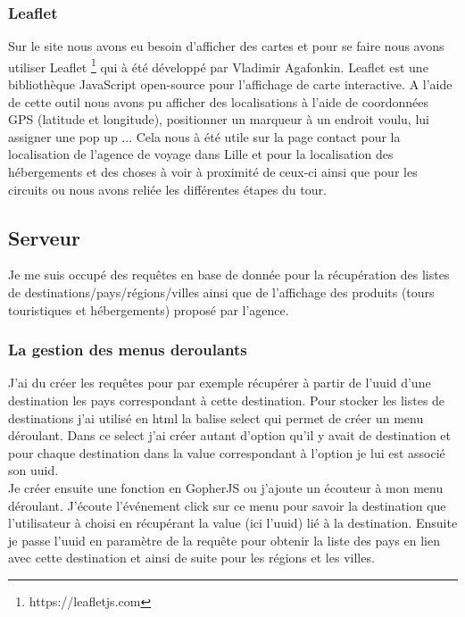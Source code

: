 \documentclass[12pt,a4paper]{report}
\begin{document}
\subsubsection{Leaflet}

Sur le site nous avons eu besoin d'afficher des cartes et pour se faire nous avons utiliser Leaflet \footnote{https://leafletjs.com} qui à été développé par Vladimir Agafonkin.  Leaflet est une bibliothèque JavaScript open-source pour l'affichage de carte interactive. A l'aide de cette outil nous avons pu afficher des localisations à l'aide de coordonnées GPS (latitude et longitude), positionner un marqueur à un endroit voulu, lui assigner une pop up ...
Cela nous à été utile sur la page contact pour la localisation de l'agence de voyage dans Lille et pour la localisation des hébergements et des choses à voir à proximité de ceux-ci ainsi que pour les circuits ou nous avons reliée les différentes étapes du tour.\\

\subsection{Serveur}
 Je me suis occupé des requêtes en base de donnée pour la récupération des listes de destinations/pays/régions/villes ainsi que de l'affichage des produits (tours touristiques et hébergements) proposé par l'agence.\\

\subsubsection{La gestion des menus deroulants}
J'ai du créer les requêtes pour par exemple récupérer à partir de l'uuid d'une destination les pays correspondant à cette destination. Pour stocker les listes de destinations j'ai utilisé en html la balise select qui permet de créer un menu déroulant. Dans ce select j'ai créer autant d'option qu'il y avait de destination et pour chaque destination dans la value correspondant à l'option je lui est associé son uuid.\\

Je créer ensuite une fonction en GopherJS ou j'ajoute un écouteur à mon menu déroulant.  J'écoute l'événement click sur ce menu pour savoir la destination que l'utilisateur à choisi en récupérant la value (ici l'uuid) lié  à la destination. Ensuite je passe l'uuid en paramètre de la requête pour obtenir la liste des pays en lien avec cette destination et ainsi de suite pour les régions et les villes. \\
\end{document}
